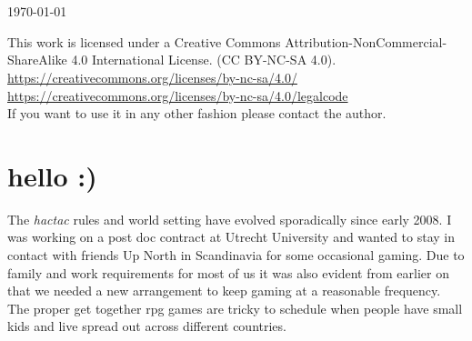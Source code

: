 \documentclass[11pt, twoside, titlepage, a4paper]{report}
\renewcommand{\chaptermark}[1]{\markboth{#1}{}}
\begin{document}
\begin{titlepage}
\begin{center}
   \vfill %


   \ %



   \ %

   \normalsize{\today}

\end{center}


\end{titlepage}




\raggedbottom

\noindent This work is licensed under a Creative Commons Attribution-NonCommercial-ShareAlike 4.0 International License. (CC BY-NC-SA 4.0).\\
\url{https://creativecommons.org/licenses/by-nc-sa/4.0/} \\
\url{https://creativecommons.org/licenses/by-nc-sa/4.0/legalcode} \\
If you want to use it in any other fashion please contact the author.






\cleardoublepage %
\raggedbottom

\chaptermark{hello}
\chapter*{hello :)}

The \emph{hactac} rules and world setting have evolved sporadically since early 2008. I was working on a post doc contract at Utrecht University and wanted to stay in contact with friends Up North in Scandinavia for some occasional gaming. Due to family and work requirements for most of us it was also evident from earlier on that we needed a new arrangement to keep gaming at a reasonable frequency. The proper get together rpg games are tricky to schedule when people have small kids and live spread out across different countries.
\end{document}
